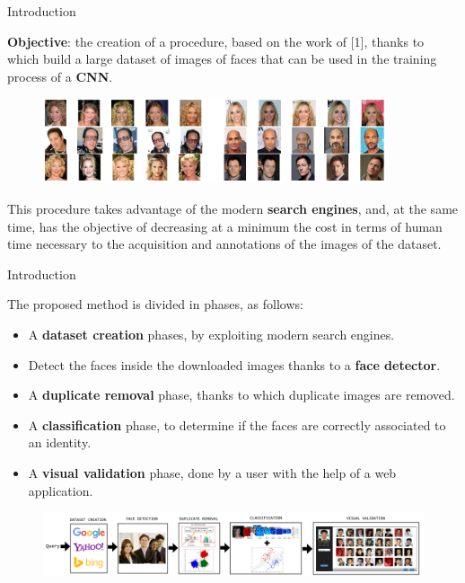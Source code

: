 \begin{tframe}{Introduction}

\textbf{Objective}: the creation of a procedure, based on the work of [1], thanks to which build a large dataset of images of faces that can be used in the training process of a \textbf{CNN}.

\begin{figure}[h]
\begin{center}
\includegraphics[width=0.9\textwidth]{images/image12.png}
\end{center}
\end{figure}

This procedure takes advantage of the modern \textbf{search engines}, and, at the same time, has the objective of decreasing at a minimum the cost in terms of human time necessary to the acquisition and annotations of the images of the dataset.

\end{tframe}

\begin{tframe}{Introduction}

The proposed method is divided in phases, as follows:

\begin{itemize}
\item A \textbf{dataset creation} phases, by exploiting modern search engines.
\item Detect the faces inside the downloaded images thanks to a \textbf{face detector}.
\item A \textbf{duplicate removal} phase, thanks to which duplicate images are removed.
\item A \textbf{classification} phase, to determine if the faces are correctly associated to an identity.
\item A \textbf{visual validation} phase, done by a user with the help of a web application.
\end{itemize}

\begin{figure}[plain]
    \hspace*{-9mm}
    \includegraphics[width=\paperwidth]{images/pipeline2.png}
\end{figure} 


\end{tframe}
